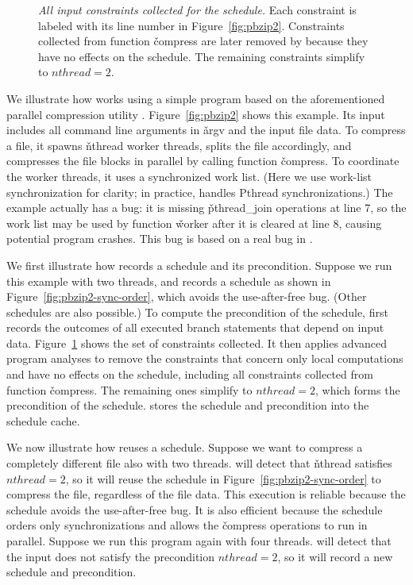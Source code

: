 \begin{figure}[t]
\centering
\begin{minipage}[c]{0.6\linewidth}
\tiny {}
\end{minipage}
\caption{{\it All input constraints collected for the schedule.}  Each
  constraint is labeled with its line number in
  Figure~\ref{fig:pbzip2}. Constraints collected from function
  \v{compress} are later removed by \tern because they have no effects on
  the schedule.  The remaining constraints simplify to
  $nthread=2$.} \label{fig:pbzip2-constraints}
\end{figure}

We illustrate how \tern works using a simple program based on the
aforementioned parallel compression utility \pbzip.
Figure~\ref{fig:pbzip2} shows this example. Its input includes all command
line arguments in \v{argv} and the input file data.
To compress a file, it spawns \v{nthread} worker threads,
splits the file accordingly, and compresses the file blocks in parallel by
calling function \v{compress}. To coordinate the worker threads, it uses a
synchronized work list. (Here we use work-list synchronization for
clarity; in practice, \tern handles Pthread synchronizations.) The example
actually has a bug: it is missing \v{pthread\_join} operations at line 7,
so the work list may be used by function \v{worker} after it is cleared at
line 8, causing potential program crashes. This bug is based on a real
bug in \pbzip.

We first illustrate how \tern records a schedule and its precondition.
Suppose we run this example with two threads, and \tern records a schedule
as shown in Figure~\ref{fig:pbzip2-sync-order}, which avoids the
use-after-free bug.  (Other schedules are also possible.)
To compute the precondition of the schedule, \tern first records the
outcomes of all executed branch statements that depend on input data.
Figure~\ref{fig:pbzip2-constraints} shows the set of constraints
collected.  It then applies advanced program analyses to remove the
constraints that concern only local computations and have no effects on
the schedule, including all constraints collected from function
\v{compress}.  The remaining ones simplify to $nthread=2$, which forms the
precondition of the schedule.  \tern stores the schedule and precondition
into the schedule cache.

We now illustrate how \tern reuses a schedule.  Suppose we want to
compress a completely different file also with two threads.  \tern will
detect that \v{nthread} satisfies $nthread=2$, so it will reuse the
schedule in Figure~\ref{fig:pbzip2-sync-order} to compress the file,
regardless of the file data.  This execution is reliable because the
schedule avoids the use-after-free bug.  It is also efficient because the
schedule orders only synchronizations and allows the \v{compress}
operations to run in parallel.  Suppose we run this program again with
four threads.  \tern will detect that the input does not satisfy the
precondition $nthread=2$, so it will record a new schedule and
precondition.




